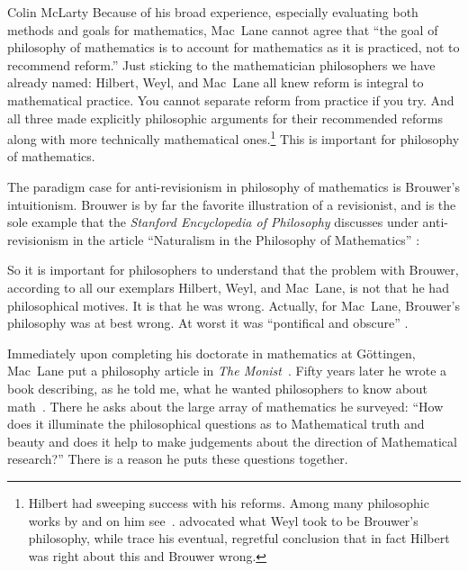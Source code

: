 \begin{artengenv}{Colin McLarty}
Because of his broad experience, especially evaluating both methods and goals for mathematics, Mac~Lane cannot agree that ``the goal of philosophy of mathematics is to account for mathematics as it is practiced, not to recommend reform.'' \parencite[p.161]{MadNat} %
Just sticking to the mathematician philosophers we have already named: Hilbert, Weyl, and Mac~Lane all knew reform is integral to mathematical practice.  You cannot separate reform from practice if you try.  And all three made explicitly philosophic arguments for their recommended reforms along with more technically mathematical ones.\footnote{Hilbert had sweeping success with his reforms.  Among many philosophic works by and on  him see~\textcite{HilbLogGrund,HilbNaturerkennen}. \textcite{WeylKontinuum} advocated what Weyl took to be Brouwer's philosophy, while \textcite{WeylDer,WeylOf} trace his eventual, regretful conclusion that in fact Hilbert was right about this and Brouwer wrong.}   This is important for philosophy of mathematics.

The paradigm case for anti-revisionism in philosophy of mathematics is Brouwer's intuitionism.  Brouwer is by far the favorite illustration of a revisionist, and is the sole example that the \textit{Stanford Encyclopedia of Philosophy} discusses under anti-revisionism in the article ``Naturalism in the Philosophy of Mathematics'' \parencite{SEPnaturalism}:

So it is important for philosophers to understand that the problem with Brouwer, according to all our exemplars Hilbert, Weyl, and Mac~Lane, is not that he had philosophical motives.  It is that he was wrong.  Actually, for Mac~Lane, Brouwer's philosophy was at best wrong.  At worst it was ``pontifical and obscure'' \parencite{MacLSymbolic}.

Immediately upon completing his doctorate in mathematics at G\"ot\-tin\-gen, Mac~Lane put a philosophy article in  \textit{The Monist}~\parencite{MacLMonist}.  Fifty years later he wrote a book describing, as he told me, what he wanted philosophers to know about math~\parencite{MFF}.  There he asks about the large array of mathematics he surveyed:
``How does it illuminate the philosophical questions as to
Mathematical truth and beauty and does it help to make judgements
about the direction of Mathematical research?''  \parencite[p.409]{MFF}
There is a reason he puts these questions together.


\end{artengenv}
